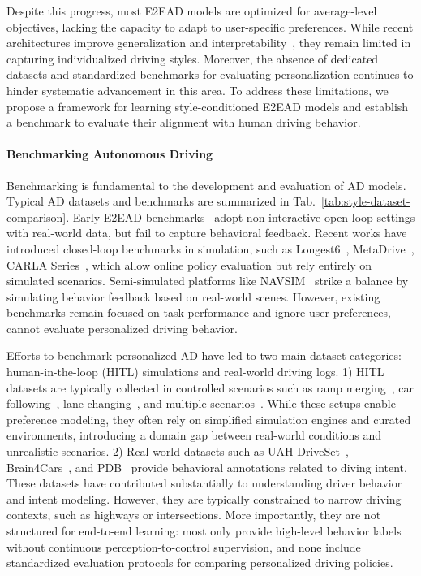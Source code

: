 \documentclass{article}
\begin{document}
Despite this progress, most E2EAD models are optimized for average-level objectives, lacking the capacity to adapt to user-specific preferences. While recent architectures improve generalization and interpretability~\cite{li2024enhancing, zheng2024genad, jia2025drivetransformer}, they remain limited in capturing individualized driving styles. Moreover, the absence of dedicated datasets and standardized benchmarks for evaluating personalization continues to hinder systematic advancement in this area. To address these limitations, we propose a framework for learning style-conditioned E2EAD models and establish a benchmark to evaluate their alignment with human driving behavior.


\paragraph{Benchmarking Autonomous Driving}
Benchmarking is fundamental to the development and evaluation of AD models. Typical AD datasets and benchmarks are summarized in Tab.~\ref{tab:style-dataset-comparison}. Early E2EAD benchmarks~\cite{caesar2020nuscenes,peng2023openscene} adopt non-interactive open-loop settings with real-world data, but fail to capture behavioral feedback. Recent works have introduced closed-loop benchmarks in simulation, such as Longest6~\cite{chitta2022transfuser},  MetaDrive~\cite{li2022metadrive}, CARLA Series~\cite{carla_leaderboard_2024}, which allow online policy evaluation but rely entirely on simulated scenarios. Semi-simulated platforms like NAVSIM~\cite{dauner2024navsim} strike a balance by simulating behavior feedback based on real-world scenes. However, existing benchmarks remain focused on task performance and ignore user preferences, cannot evaluate personalized driving behavior.

Efforts to benchmark personalized AD have led to two main dataset categories: human-in-the-loop (HITL) simulations and real-world driving logs. 1) HITL datasets are typically collected in controlled scenarios such as ramp merging~\cite{li2023personalized}, car following~\cite{zhao2022personalized}, lane changing~\cite{liao2023driver}, and multiple scenarios~\cite{ke2024d2e}. While these setups enable preference modeling, they often rely on simplified simulation engines and curated environments, introducing a domain gap between real-world conditions and unrealistic scenarios. 2) Real-world datasets such as UAH-DriveSet~\cite{romera2016need}, Brain4Cars~\cite{jain2016brain4cars}, and PDB~\cite{wei2025pdb} provide behavioral annotations related to diving intent. These datasets have contributed substantially to understanding driver behavior and intent modeling. However, they are typically constrained to narrow driving contexts, such as highways or intersections. More importantly, they are not structured for end-to-end learning: most only provide high-level behavior labels without continuous perception-to-control supervision, and none include standardized evaluation protocols for comparing personalized driving policies.
\end{document}

